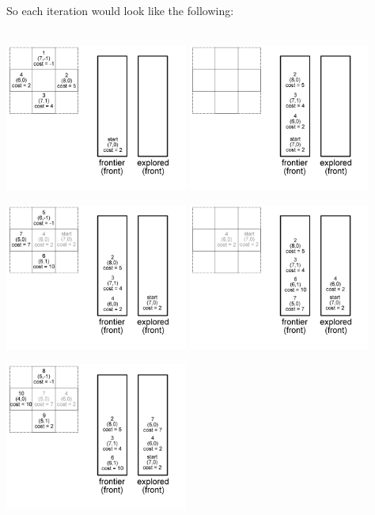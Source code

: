 \documentclass[12pt]{article}
\begin{document}
	So each iteration would look like the following: \\ \\
	\begin{center}
		\includegraphics[width=60mm]{images/cost/pos01.png}
		\includegraphics[width=60mm]{images/cost/pos02.png}
	\end{center}
	\begin{center}
		\includegraphics[width=60mm]{images/cost/pos03.png}
		\includegraphics[width=60mm]{images/cost/pos04.png}
	\end{center}
	\begin{center}
		\includegraphics[width=60mm]{images/cost/pos05.png}
	\end{center}
\end{document}
